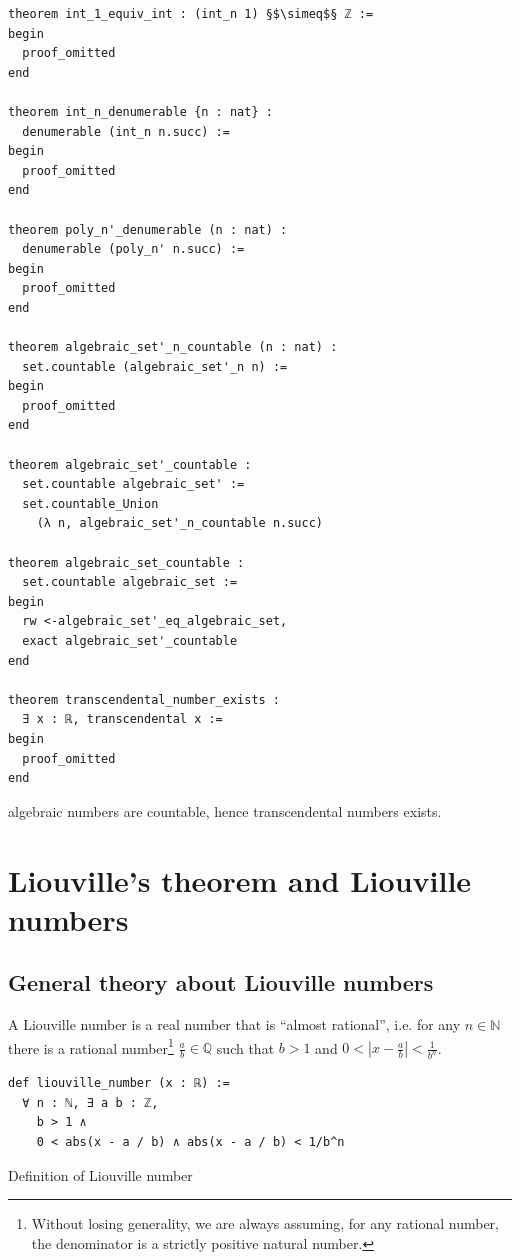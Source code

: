 \documentclass{report}
\theoremstyle{definition}
\newenvironment{code}{\captionsetup{type=listing}}{}
\begin{document}
\begin{code}
\begin{verbatim}
theorem int_1_equiv_int : (int_n 1) §$\simeq$§ ℤ := 
begin
  proof_omitted
end

theorem int_n_denumerable {n : nat} :
  denumerable (int_n n.succ) :=
begin
  proof_omitted
end

theorem poly_n'_denumerable (n : nat) : 
  denumerable (poly_n' n.succ) :=
begin
  proof_omitted
end

theorem algebraic_set'_n_countable (n : nat) :
  set.countable (algebraic_set'_n n) :=
begin
  proof_omitted
end

theorem algebraic_set'_countable : 
  set.countable algebraic_set' :=
  set.countable_Union 
    (λ n, algebraic_set'_n_countable n.succ)

theorem algebraic_set_countable : 
  set.countable algebraic_set :=
begin
  rw <-algebraic_set'_eq_algebraic_set, 
  exact algebraic_set'_countable
end

theorem transcendental_number_exists : 
  ∃ x : ℝ, transcendental x :=
begin
  proof_omitted
end
\end{verbatim}
\caption{algebraic numbers are countable, hence transcendental numbers exists.}
\end{code}


\section{Liouville's theorem and Liouville numbers}\label{fmlsn:li}
\subsection*{General theory about Liouville numbers}
A Liouville number is a real number that is ``almost rational'', i.e. for any $n\in\mathbb N$ there is a rational number\footnote{Without losing generality, we are always assuming, for any rational number, the denominator is a strictly positive natural number.} $\frac ab\in\mathbb Q$ such that $b > 1$ and $0< |x-\frac ab|<\frac1{b^n}$.
\begin{code}
\begin{verbatim}
def liouville_number (x : ℝ) := 
  ∀ n : ℕ, ∃ a b : ℤ,  
    b > 1 ∧ 
    0 < abs(x - a / b) ∧ abs(x - a / b) < 1/b^n
\end{verbatim}
\caption{Definition of Liouville number}
\end{code}
\end{document}
